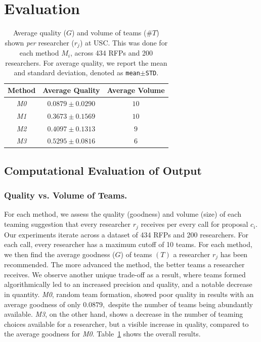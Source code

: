 \section{Evaluation} \label{sec:evaluation}

\begin{table}
    \centering
    \begin{tabular}{c|c|c}
        \toprule 
    Method  & Average Quality & Average Volume \\
    \midrule 
    \textit{M0} & $0.0879\pm0.0290$ & $10$ \\
    \textit{M1} & $0.3673\pm0.1569$ & $10$ \\
    \textit{M2} & $0.4097\pm0.1313$ & $9$ \\
    \textit{M3} & $0.5295\pm0.0816$ & $6$ \\
    \bottomrule
    \end{tabular}
    \caption{Average quality ($G$) and volume of teams (\#$T$) shown \textit{per} researcher ($r_j$) at USC. This was done for each method $M_i$, across 434 RFPs and 200 researchers. For average quality, we report the mean and standard deviation, denoted as \texttt{mean$\pm$STD}.} \label{tab:volume_quality}
\end{table}

\subsection{Computational Evaluation of Output}
\subsubsection{Quality vs. Volume of Teams.}

For each method, we assess the quality (goodness) and volume (size) of each teaming suggestion that every researcher $r_j$ receives per every call for proposal $c_i$. Our experiments iterate across a dataset of 434 RFPs and 200 researchers. For each call, every researcher has a maximum cutoff of 10 teams. For each method, we then find the average goodness ($G$) of teams $(T)$ a researcher $r_j$ has been recommended.
The more advanced the method, the better teams a researcher receives. We observe another unique trade-off as a result, where teams formed algorithmically led to an increased precision and quality, and a notable decrease in quantity. \textit{M0}, random team formation, showed poor quality in results with an average goodness of only $0.0879,$ despite the number of teams being abundantly available. \textit{M3}, on the other hand, shows a decrease in the number of teaming choices available for a researcher, but a visible increase in quality, compared to the average goodness for \textit{M0}.
Table~\ref{tab:volume_quality} shows the overall results. 

